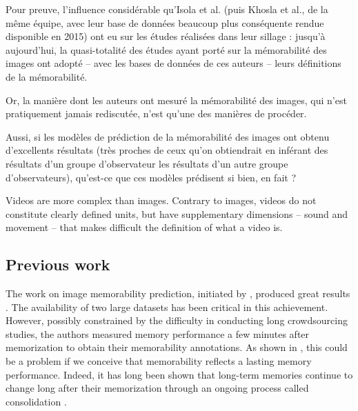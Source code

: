\documentclass[sigconf]{acmart}
\begin{document}
Pour preuve, l'influence considérable qu'Isola et al. (puis Khosla et al., de la même équipe, avec leur base de données beaucoup plus conséquente rendue disponible en 2015) ont eu sur les études réalisées dans leur sillage : jusqu'à aujourd'hui, la quasi-totalité des études ayant porté sur la mémorabilité des images ont adopté – avec les bases de données de ces auteurs – leurs définitions de la mémorabilité.

Or, la manière dont les auteurs ont mesuré la mémorabilité des images, qui n'est pratiquement jamais rediscutée, n'est qu'une des manières de procéder.

Aussi, si les modèles de prédiction de la mémorabilité des images ont obtenu d'excellents résultats (très proches de ceux qu'on obtiendrait en inférant des résultats d'un groupe d'observateur les résultats d'un autre groupe d'observateurs), qu'est-ce que ces modèles prédisent si bien, en fait ? 

Videos are more complex than images. Contrary to images, videos do not constitute clearly defined units, but have supplementary dimensions -- sound and movement -- that makes difficult the definition of what a video is.


\subsection{Previous work} %
The work on image memorability prediction, initiated by \cite{isola_2011_makes}, produced great results \cite{khosla_2015_understanding,baveye_2016_deep,squalli_2017_deep}.
The availability of two large datasets \cite{isola_2011_makes,khosla_2015_understanding} has been critical in this achievement. 
However, possibly constrained by the difficulty in conducting long crowdsourcing studies, the authors measured memory performance a few minutes after memorization to obtain their memorability annotations.
As shown in \cite{cohendet_2016_prediction}, this could be a problem if we conceive that memorability reflects a lasting memory performance.
Indeed, it has long been shown that long-term memories continue to change long after their memorization through an ongoing process called consolidation \cite{mcgaugh_2000_memory}.
\end{document}

